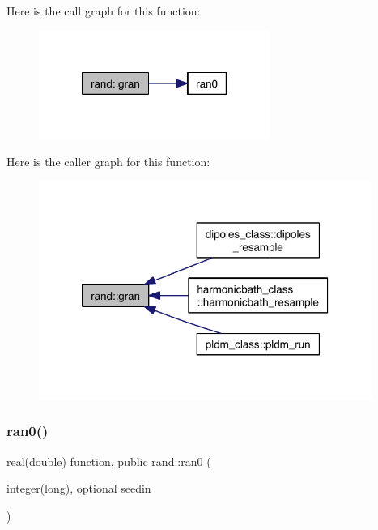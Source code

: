 Here is the call graph for this function\+:\nopagebreak
\begin{figure}[H]
\begin{center}
\leavevmode
\includegraphics[width=214pt]{namespacerand_a7bf88c16a64dbc594c0b21871f34e15c_cgraph}
\end{center}
\end{figure}
Here is the caller graph for this function\+:\nopagebreak
\begin{figure}[H]
\begin{center}
\leavevmode
\includegraphics[width=308pt]{namespacerand_a7bf88c16a64dbc594c0b21871f34e15c_icgraph}
\end{center}
\end{figure}
\mbox{\label{namespacerand_a750567ffa303a800f86ffc3bd5705137}} 
\subsubsection{\texorpdfstring{ran0()}{ran0()}}
{\footnotesize\ttfamily real(double) function, public rand\+::ran0 (\begin{DoxyParamCaption}\item[{integer(long), optional}]{seedin }\end{DoxyParamCaption})}

